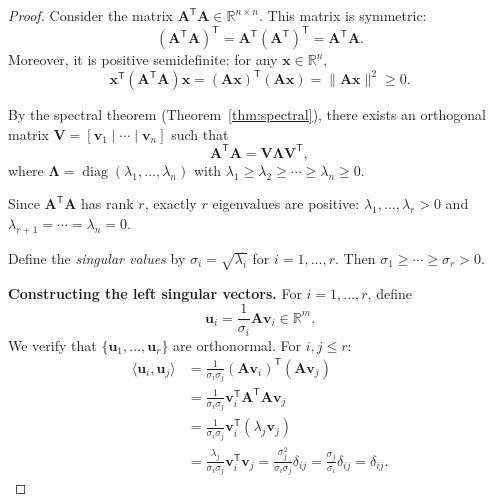 \begin{proof}
  Consider the matrix $\mathbf{A}^{\mathsf{T}}\mathbf{A} \in \mathbb{R}^{n \times n}$. This matrix is symmetric:
  \[
    (\mathbf{A}^{\mathsf{T}}\mathbf{A})^{\mathsf{T}} = \mathbf{A}^{\mathsf{T}}(\mathbf{A}^{\mathsf{T}})^{\mathsf{T}} = \mathbf{A}^{\mathsf{T}}\mathbf{A}.
  \]
  Moreover, it is positive semidefinite: for any $\mathbf{x} \in \mathbb{R}^n$,
  \[
    \mathbf{x}^{\mathsf{T}}(\mathbf{A}^{\mathsf{T}}\mathbf{A})\mathbf{x} = (\mathbf{A}\mathbf{x})^{\mathsf{T}}(\mathbf{A}\mathbf{x}) = \|\mathbf{A}\mathbf{x}\|^2 \geq 0.
  \]

  By the spectral theorem (Theorem~\ref{thm:spectral}), there exists an orthogonal matrix $\mathbf{V} = [\mathbf{v}_1 \mid \cdots \mid \mathbf{v}_n]$ such that
  \[
    \mathbf{A}^{\mathsf{T}}\mathbf{A} = \mathbf{V}\mathbf{\Lambda}\mathbf{V}^{\mathsf{T}},
  \]
  where $\mathbf{\Lambda} = \operatorname{diag}(\lambda_1,\dots,\lambda_n)$ with $\lambda_1 \geq \lambda_2 \geq \cdots \geq \lambda_n \geq 0$.

  Since $\mathbf{A}^{\mathsf{T}}\mathbf{A}$ has rank $r$, exactly $r$ eigenvalues are positive: $\lambda_1,\dots,\lambda_r > 0$ and $\lambda_{r+1} = \cdots = \lambda_n = 0$.

  Define the \emph{singular values} by $\sigma_i = \sqrt{\lambda_i}$ for $i = 1,\dots,r$. Then $\sigma_1 \geq \cdots \geq \sigma_r > 0$.

  \textbf{Constructing the left singular vectors.} For $i = 1,\dots,r$, define
  \[
    \mathbf{u}_i = \frac{1}{\sigma_i} \mathbf{A}\mathbf{v}_i \in \mathbb{R}^m.
  \]
  We verify that $\{\mathbf{u}_1,\dots,\mathbf{u}_r\}$ are orthonormal. For $i, j \leq r$:
  \begin{align*}
    \langle \mathbf{u}_i, \mathbf{u}_j \rangle
     & = \frac{1}{\sigma_i \sigma_j} (\mathbf{A}\mathbf{v}_i)^{\mathsf{T}}(\mathbf{A}\mathbf{v}_j)                                                                                            \\
     & = \frac{1}{\sigma_i \sigma_j} \mathbf{v}_i^{\mathsf{T}} \mathbf{A}^{\mathsf{T}}\mathbf{A} \mathbf{v}_j                                                                                 \\
     & = \frac{1}{\sigma_i \sigma_j} \mathbf{v}_i^{\mathsf{T}} (\lambda_j \mathbf{v}_j)                                                                                                       \\
     & = \frac{\lambda_j}{\sigma_i \sigma_j} \mathbf{v}_i^{\mathsf{T}} \mathbf{v}_j = \frac{\sigma_j^2}{\sigma_i \sigma_j} \delta_{ij} = \frac{\sigma_j}{\sigma_i} \delta_{ij} = \delta_{ij}.
  \end{align*}


\end{proof}
